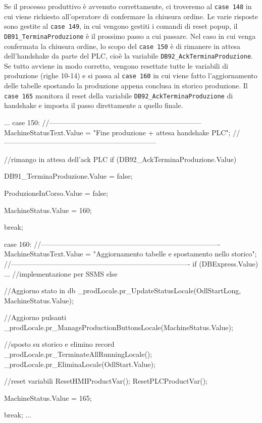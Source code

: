 Se il processo produttivo è avvenuto correttamente, ci troveremo al \verb|case 148| in cui viene richiesto all'operatore di confermare la chiusura ordine. Le varie risposte sono gestite al \verb|case 149|, in cui vengono gestiti i comandi di reset popup, il \verb|DB91_TerminaProduzione| è il prossimo passo a cui passare. Nel caso in cui venga confermata la chiusura ordine, lo scopo del \verb|case 150| è di rimanere in attesa dell'handshake da parte del PLC, cioè la variabile \verb|DB92_AckTerminaProduzione|. Se tutto avviene in modo corretto, vengono resettate tutte le variabili di produzione (righe 10-14) e si passa al \verb|case 160| in cui viene fatto l'aggiornamento delle tabelle spostando la produzione appena conclusa in storico produzione. Il \verb|case 165| monitora il reset della variabile \verb|DB92_AckTerminaProduzione| di handshake e imposta il passo direttamente a quello finale. 
\begin{csharp}
...
    case 150:
    //-----------------------------------------------------------------
    MachineStatusText.Value = "Fine produzione + attesa handshake PLC";
    //-----------------------------------------------------------------

    //rimango in attesa dell'ack PLC
    if (DB92_AckTerminaProduzione.Value)
    {
        DB91_TerminaProduzione.Value = false;

        ProduzioneInCorso.Value = false;

        MachineStatus.Value = 160;
    }

    break;

    case 160:
    //----------------------------------------------------------------------------
    MachineStatusText.Value = "Aggiornamento tabelle e spostamento nello storico";
    //----------------------------------------------------------------------------
    if (DBExpress.Value) {
        ... //implementazione per SSMS
    }
    else
    {
        //Aggiorno stato in db
        _prodLocale.pr_UpdateStatusLocale(OdlStartLong, MachineStatus.Value);

        //Aggiorno pulsanti
        _prodLocale.pr_ManageProductionButtonsLocale(MachineStatus.Value);

        //sposto su storico e elimino record
        _prodLocale.pr_TerminateAllRunningLocale();
        _prodLocale.pr_EliminaLocale(OdlStart.Value);

        //reset variabili
        ResetHMIProductVar();
        ResetPLCProductVar();

        MachineStatus.Value = 165;
    }
    
    break;
...
\end{csharp}
